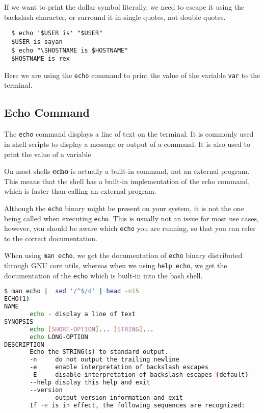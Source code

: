 \begin{remark}
  If we want to print the dollar symbol literally, we need to escape it using the backslash character, or surround it in single quotes, not double quotes.
  \begin{lstlisting}
  $ echo '$USER is' "$USER"
  $USER is sayan
  $ echo "\$HOSTNAME is $HOSTNAME"
  $HOSTNAME is rex\end{lstlisting}
\end{remark}

Here we are using the \lstinline{echo} command to print the value of the variable \lstinline{var} to the terminal.

\subsection{Echo Command}

The \lstinline{echo} command displays a line of text on the terminal. It is commonly used in shell scripts to display a message or output of a command. It is also used to print the value of a variable.

On most shells \textbf{echo} is actually a built-in command, not an external program. This means that the shell has a built-in implementation of the echo command, which is faster than calling an external program.

Although the \lstinline{echo} binary might be present on your system, it is not the one being called when executing \lstinline{echo}. This is usually not an issue for most use cases, however, you should be aware which \lstinline{echo} you are running, so that you can refer to the correct documentation.

When using \lstinline{man echo}, we get the documentation of \lstinline{echo} binary distributed through GNU core utils, whereas when we using \lstinline{help echo}, we get the documentation of the \lstinline{echo} which is built-in into the bash shell.

\begin{lstlisting}[language=bash]
$ man echo |  sed '/^$/d' | head -n15
ECHO(1)                                                                                User Commands                                                                               ECHO(1)
NAME
       echo - display a line of text
SYNOPSIS
       echo [SHORT-OPTION]... [STRING]...
       echo LONG-OPTION
DESCRIPTION
       Echo the STRING(s) to standard output.
       -n     do not output the trailing newline
       -e     enable interpretation of backslash escapes
       -E     disable interpretation of backslash escapes (default)
       --help display this help and exit
       --version
              output version information and exit
       If -e is in effect, the following sequences are recognized:
\end{lstlisting}

